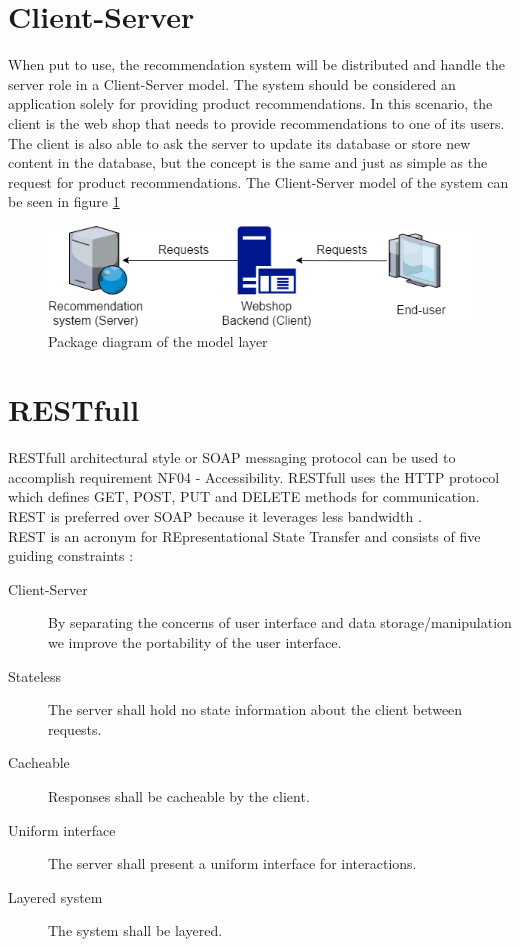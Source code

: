 \section{Client-Server}
When put to use, the recommendation system will be distributed and handle the server role in a Client-Server model. The system should be considered an application solely for providing product recommendations. In this scenario, the client is the web shop that needs to provide recommendations to one of its users. The client is also able to ask the server to update its database or store new content in the database, but the concept is the same and just as simple as the request for product recommendations. The Client-Server model of the system can be seen in figure \ref{fig:ClientServer}

\begin{figure}[H]
	\centering
	\includegraphics[width=.8\linewidth]{Figures/ClientServer.png}
	\caption{Package diagram of the model layer}
	\label{fig:ClientServer}
\end{figure}

\section{RESTfull}
RESTfull architectural style or SOAP messaging protocol can be used to accomplish requirement NF04 - Accessibility. RESTfull uses the HTTP protocol which defines GET, POST, PUT and DELETE methods for communication. REST is preferred over SOAP because it leverages less bandwidth \cite{restfull}. \\
REST is an acronym for REpresentational State Transfer and consists of five guiding constraints \cite{rest}:
\begin{description}
\item [Client-Server] By separating the concerns of user interface and data storage/manipulation we improve the portability of the user interface.
\item [Stateless] The server shall hold no state information about the client between requests.
\item [Cacheable] Responses shall be cacheable by the client.
\item [Uniform interface] The server shall present a uniform interface for interactions.
\item [Layered system] The system shall be layered.
\end{description}


